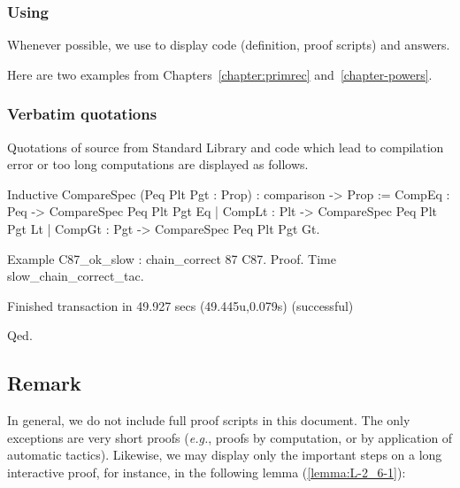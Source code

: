 \documentclass[twoside,a4paper]{book}
\makeatletter
\newcounter{snippets}
\newcommand{\inputsnippets}[1]
  {{\setlength{\itemsep}{1pt}\setlength{\parsep}{0pt}%
    \alectryon@copymacros\begin{io}
      \forcsvlist{\item\@inputsnippet}{#1}
    \end{io}}}
\let@old Save definition of 
\newcommand{\@inputsnippet}[1]
  {{\renewenvironment{alectryon}{}{}%
    \refstepcounter{snippets}%
    @old{movies/snippets/#1}}}
\makeatother
\begin{document}
\subsubsection{Using \alectr}
Whenever possible, we use \alectr to display \coq code (definition, proof scripts) and answers.

Here are two  examples from Chapters~\ref{chapter:primrec}
and~\ref{chapter-powers}.

\vspace{4pt}




\inputsnippets{Fib2/fibEuclDemo}

\subsubsection{Verbatim quotations}

Quotations of \coq{} source  from Standard Library and code which lead to compilation error or too long computations are displayed as follows.

\begin{Coqsrc}
  Inductive CompareSpec (Peq Plt Pgt : Prop) :
  comparison -> Prop :=
    CompEq : Peq -> CompareSpec Peq Plt Pgt Eq
  | CompLt : Plt -> CompareSpec Peq Plt Pgt Lt
  | CompGt : Pgt -> CompareSpec Peq Plt Pgt Gt.
\end{Coqsrc}


\begin{Coqbad}
Example C87_ok_slow : chain_correct 87 C87.
Proof.
Time slow_chain_correct_tac.
\end{Coqbad}

\begin{Coqanswer}
Finished transaction in 49.927 secs (49.445u,0.079s) (successful)
\end{Coqanswer}

\begin{Coqbad}
Qed.
\end{Coqbad}

 \subsection{Remark}
 
In general, we do not include full proof scripts in this document. The only exceptions are very short proofs (\emph{e.g.}, proofs by computation, or by application of automatic tactics). Likewise, we may display only the important steps on a long interactive proof, for instance, in the following lemma (\vref{lemma:L-2_6-1}):
\end{document}
